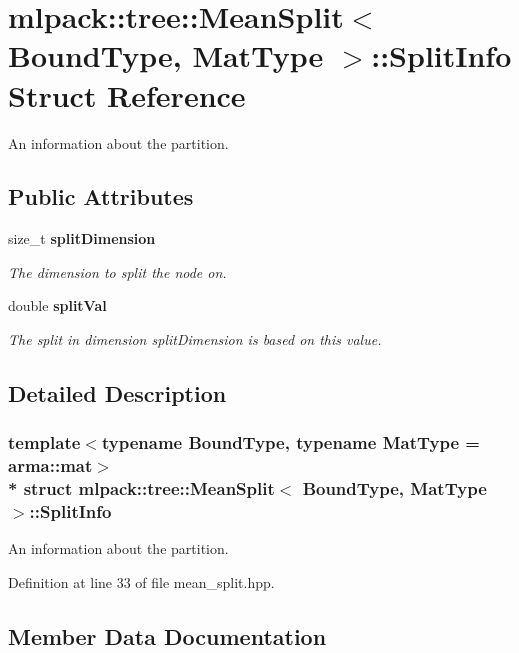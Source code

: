 \section{mlpack\+:\+:tree\+:\+:Mean\+Split$<$ Bound\+Type, Mat\+Type $>$\+:\+:Split\+Info Struct Reference}
\label{structmlpack_1_1tree_1_1MeanSplit_1_1SplitInfo}


An information about the partition.  


\subsection*{Public Attributes}
\begin{DoxyCompactItemize}
\item 
size\+\_\+t {\bf split\+Dimension}
\begin{DoxyCompactList}\small\item\em The dimension to split the node on. \end{DoxyCompactList}\item 
double {\bf split\+Val}
\begin{DoxyCompactList}\small\item\em The split in dimension split\+Dimension is based on this value. \end{DoxyCompactList}\end{DoxyCompactItemize}


\subsection{Detailed Description}
\subsubsection*{template$<$typename Bound\+Type, typename Mat\+Type = arma\+::mat$>$\\*
struct mlpack\+::tree\+::\+Mean\+Split$<$ Bound\+Type, Mat\+Type $>$\+::\+Split\+Info}

An information about the partition. 

Definition at line 33 of file mean\+\_\+split.\+hpp.



\subsection{Member Data Documentation}
